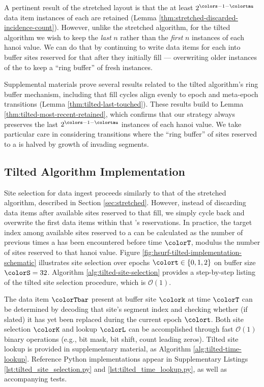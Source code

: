 A pertinent result of the stretched layout is that the at least $2^{\colors - 1 - \colortau}$ data item instances of each \hv{} are retained (Lemma \ref{thm:stretched-discarded-incidence-count}).
However, unlike the stretched algorithm, for the tilted algorithm we wish to keep the \textit{last} $n$ rather than the \textit{first} $n$ instances of each hanoi value.
We can do that by continuing to write data items for each \hv{} into buffer sites reserved for that \hv{} after they initially fill --- overwriting older instances of the \hv{} to keep a ``ring buffer'' of fresh \hv{} instances.

Supplemental materials prove several results related to the tilted algorithm's ring buffer mechanism, including that fill cycles align evenly to epoch and meta-epoch transitions (Lemma \ref{thm:tilted-last-touched}).
These results build to Lemma \ref{thm:tilted-most-recent-retained}, which confirms that our strategy always preserves the last $2^{\colors - 1 - \colortau}$ instances of each hanoi value.
We take particular care in considering transitions where the ``ring buffer'' of sites reserved to a \hv{} is halved by growth of invading segments.

\subsection{Tilted Algorithm Implementation}
\label{sec:tilted-implementation}



Site selection for data ingest proceeds similarly to that of the stretched algorithm, described in Section \ref{sec:stretched}. However, instead of discarding data items after available sites reserved to that \hv{} fill, we simply cycle back and overwrite the first data items within that \hv{}'s reservations.
In practice, the target index among available sites reserved to a \hv{} can be calculated as the number of previous times a \hv{} has been encountered before time $\colorT$, modulus the number of sites reserved to that hanoi value.
Figure \ref{fig:hsurf-tilted-implementation-schematic} illustrates site selection over epochs $\colort \in \{0,1,2\}$ on buffer size $\colorS=32$.
Algorithm \ref{alg:tilted-site-selection} provides a step-by-step listing of the tilted site selection procedure, which is $\mathcal{O}(1)$.



The data item $\colorTbar$ present at buffer site $\colork$ at time $\colorT$ can be determined by decoding that site's segment index and checking whether (if slated) it has yet been replaced during the current epoch $\colort$.
Both site selection $\colorK$ and lookup $\colorL$ can be accomplished through fast $\mathcal{O}(1)$ binary operations (e.g., bit mask, bit shift, count leading zeros).
Tilted site lookup is provided in supplementary material, as Algorithm \ref{alg:tilted-time-lookup}.
Reference Python implementations appear in Supplementary Listings \ref{lst:tilted_site_selection.py} and \ref{lst:tilted_time_lookup.py}, as well as accompanying tests.

